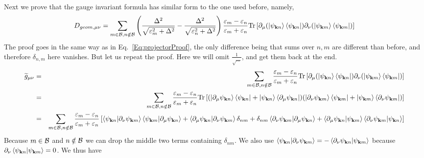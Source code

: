 \documentclass[onecolumn, prb,preprintnumbers,amsmath,amssymb,floatfix]{revtex4}
\newcommand{\vk}{{\mathbf{k}}}
\newcommand{\Tr}{\mathrm{Tr}} \newcommand{\npsi}{\underline{\psi}}
\newcommand{\cb}{{\cal B}}
\begin{document}
Next we prove that the gauge invariant formula has similar form to the
one used before, namely,
\begin{eqnarray}
  D_{geom,\mu\nu}=  \sum_{m\in\cb,n\notin\cb}
 \left( \frac{\Delta^2}{\sqrt{\varepsilon_m^2+\Delta^2}}-
  \frac{\Delta^2}{\sqrt{\varepsilon_n^2+\Delta^2}}
  \right)
  \frac{\varepsilon_m-\varepsilon_n}{\varepsilon_m+\varepsilon_n}
  \Tr\left[ \partial_\mu(\ket{\psi_{\vk n}}\bra{\psi_{\vk n}})  \partial_\nu (\ket{\psi_{\vk m}}\bra{\psi_{\vk m}})
  \right]
\end{eqnarray}  
The proof goes in the same way as in Eq.~\ref{Eq:projectorProof}, the
only difference being that sums over $n,m$ are different than before,
and therefore $\delta_{n,m}$ here vanishes.
But let us repeat the proof. Here we will omit $\frac{1}{\sqrt{...}}$,
and get them back at the end.
\begin{eqnarray}
  \widetilde{g}_{\mu\nu}&=&  \sum_{m\in\cb,n\notin\cb}
  \frac{\varepsilon_m-\varepsilon_n}{\varepsilon_m+\varepsilon_n}
  \Tr\left[ \partial_\mu(\ket{\psi_{\vk n}}\bra{\psi_{\vk n}})  \partial_\nu (\ket{\psi_{\vk m}}\bra{\psi_{\vk m}})
  \right]\\
&=&  \sum_{m\in\cb,n\notin\cb}
  \frac{\varepsilon_m-\varepsilon_n}{\varepsilon_m+\varepsilon_n}
  \Tr\left[
  (\ket{\partial_\mu\psi_{\vk n}}\bra{\psi_{\vk n}}+\ket{\psi_{\vk n}}\bra{\partial_\mu\psi_{\vk n}})
  (\ket{\partial_\nu \psi_{\vk m}}\bra{\psi_{\vk m}}+\ket{\psi_{\vk m}}\bra{\partial_\nu \psi_{\vk m}})
  \right]
  \nonumber\\
&=&  \sum_{m\in\cb,n\notin\cb}
  \frac{\varepsilon_m-\varepsilon_n}{\varepsilon_m+\varepsilon_n}
  \left[
   \braket{\psi_{\vk n}|\partial_\nu \psi_{\vk m}}\braket{\psi_{\vk m}|\partial_\mu\psi_{\vk n}}+
    \braket{\partial_\mu\psi_{\vk n}|\partial_\nu \psi_{\vk  m}}\delta_{n m}+
   \delta_{n m}\braket{\partial_\nu \psi_{\vk m}|\partial_\mu\psi_{\vk n}}+
   \braket{\partial_\mu\psi_{\vk n}|\psi_{\vk m}}\braket{\partial_\nu \psi_{\vk m}|\psi_{\vk n}}
  \right]
  \nonumber
\end{eqnarray}  
Because $m\in \cb$ and $n\notin\cb$ we can drop the middle two terms
containing $\delta_{nm}$. We also use $\braket{\psi_{\vk n}|\partial_\nu \psi_{\vk m}}=-\braket{\partial_\nu \psi_{\vk n}|\psi_{\vk m}}$
because $\partial_\nu \braket{\psi_{\vk n}|\psi_{\vk m}}=0$.
We thus have
\end{document}
